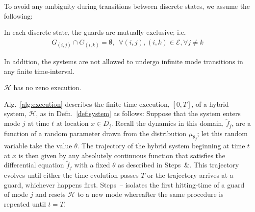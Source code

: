 To avoid any ambiguity during transitions between discrete states, we assume the following:
\begin{assump}
    In each discrete state, the guards are mutually exclusive; i.e.
    \begin{align}
     G_{(i,j)}\cap G_{(i,k)}=\emptyset,\phantom{8}\forall (i,j),(i,k)\in \mathcal E, \forall j\ne k
    \end{align}
\end{assump}
In addition, the systems are not allowed to undergo infinite mode transitions in any finite time-interval.
\begin{assump}
  $\mathcal H$ has no zeno execution.
  \label{assump:zeno}
\end{assump}
Alg.~\ref{alg:execution} describes the finite-time execution, $[0,T]$, of a hybrid system, $\mathcal H$, as in Defn.~\ref{def:system} as follows:
Suppose that the system enters mode $j$ at time $t$ at location $x \in D_j$.
Recall the dynamics in this domain, $\tilde f_j$, are a function of a random parameter drawn from the distribution $\mu_{\theta_j}$; let this random variable take the value $\theta$.
The trajectory of the hybrid system beginning at time $t$ at $x$ is then given by any absolutely continuous function that satisfies the differential equation $\tilde f_j$ with a fixed $\theta$ as described in Steps~\&.
This trajectory evolves until either the time evolution passes $T$ or the trajectory arrives at a guard, whichever happens first.
Steps~-- isolates the first hitting-time of a guard of mode $j$ and resets $\mathcal H$ to a new mode whereafter the same procedure is repeated until $t=T$.



